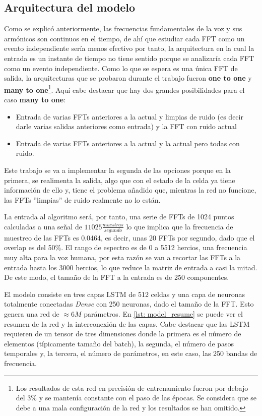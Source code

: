 \subsection{Arquitectura del modelo}
Como se explicó anteriormente, las frecuencias fundamentales de la voz y sus armónicos son continuos en el tiempo, de ahí que estudiar cada \gls{FFT} como un evento independiente sería menos efectivo por tanto, la arquitectura en la cual la entrada es un instante de tiempo no tiene sentido porque se analizaría cada \gls{FFT} como un evento independiente. Como lo que se espera es una única \gls{FFT} de salida, la arquitecturas que se probaron durante el trabajo fueron \textbf{one to one} y \textbf{many to one}\footnote{Los resultados de esta red en precisión de entrenamiento fueron por debajo del 3\% y se mantenía constante con el paso de las épocas. Se considera que se debe a una mala configuración de la red y los resultados se han omitido.}. Aquí cabe destacar que hay dos grandes posibilidades para el caso \textbf{many to one}:
\begin{itemize}
	\item Entrada de varias \glspl{FFT} anteriores a la actual y limpias de ruido (es decir darle varias salidas anteriores como entrada) y la \gls{FFT} con ruido actual
	\item Entrada de varias \glspl{FFT} anteriores a la actual y la actual pero todas con ruido.
\end{itemize}
Este trabajo se va a implementar la segunda de las opciones porque en la primera, se realimenta la salida, algo que con el estado de la celda ya tiene información de ello y, tiene el problema añadido que, mientras la red no funcione, las \glspl{FFT} ''limpias'' de ruido realmente no lo están.

La entrada al algoritmo será, por tanto, una serie de \glspl{FFT} de 1024 puntos calculadas a una señal de $11025\frac{muestras}{segundo}$ lo que implica que la frecuencia de muestreo de las \glspl{FFT} es 0.0464, es decir, unas 20 \glspl{FFT} por segundo, dado que el overlap es del 50\%. El rango de espectro es de 0 a 5512 hercios, una frecuencia muy alta para la voz humana, por esta razón se van a recortar las \glspl{FFT} a la entrada hasta los 3000 hercios, lo que reduce la matriz de entrada a casi la mitad. De este modo, el tamaño de la \gls{FFT} a la entrada es de 250 componentes.

El modelo consiste en tres capas \gls{LSTM} de 512 celdas y una capa de neuronas totalmente conectadas \textit{Dense} con 250 neuronas, dado el tamaño de la \gls{FFT}. Esto genera una red de $\approx6M$ parámetros. En \ref{lst: model_resume} se puede ver el resumen de la red y la interconexión de las capas. Cabe destacar que las \gls{LSTM} requieren de un tensor de tres dimensiones donde la primera es el número de elementos (típicamente tamaño del batch), la segunda, el número de pasos temporales y, la tercera, el número de parámetros, en este caso, las 250 bandas de frecuencia.

